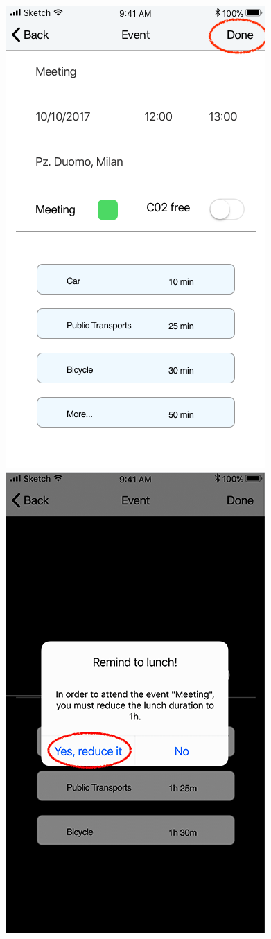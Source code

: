 \begin{figure}[H]
	\includegraphics[scale=0.23]{Images/Interface/Lunch/2_single_event_view}
	\hspace{0.5cm}
	\includegraphics[scale=0.23]{Images/Interface/Lunch/3_lunch_warning}

\end{figure}

